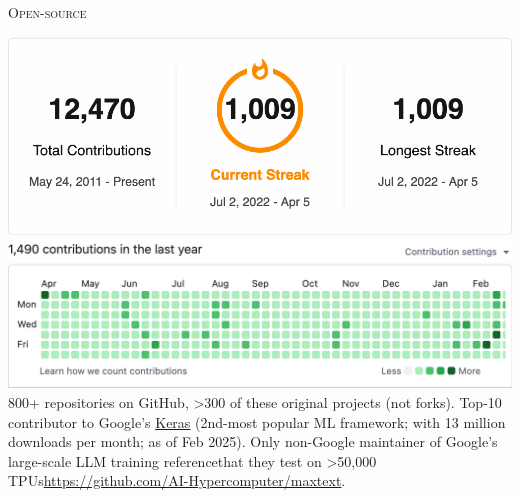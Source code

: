\documentclass[11pt, a4paper]{article}
\newcommand{\headright}[1]{\vspace*{2.5ex}\textsc{\Large\color{cvblue}#1}\par%
     \vspace*{-2ex}{\color{cvblue}\hrulefill}\par}
\begin{document}
\begin{minipage}[t]{0.56\textwidth}
\headright{Open-source}
\includegraphics[width=1.101\columnwidth]{images/github0.png}
\includegraphics[width=1.101\columnwidth]{images/github1.png}
800+ repositories on GitHub, >300 of these original projects (not forks). Top-10 contributor to Google's \href{https://keras.io}{Keras} (2nd-most popular ML framework; with 13 million downloads per month; as of Feb 2025). Only non-Google maintainer of Google's large-scale LLM training reference\textemdash{}that they test on >50,000 TPUs\textemdash{}\href{https://github.com/AI-Hypercomputer/maxtext}{https://github.com/AI-Hypercomputer/maxtext}.

\end{minipage}
\end{document}
